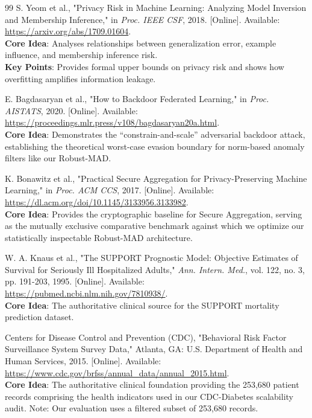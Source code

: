 \documentclass[10pt, a4paper, twocolumn]{article}
\begin{document}
\begin{thebibliography}{99}
 S. Yeom et al., "Privacy Risk in Machine Learning: Analyzing Model Inversion and Membership Inference," in \textit{Proc. IEEE CSF}, 2018. [Online]. Available: \url{https://arxiv.org/abs/1709.01604}. \\
\textbf{Core Idea}: Analyses relationships between generalization error, example influence, and membership inference risk. \\
\textbf{Key Points}: Provides formal upper bounds on privacy risk and shows how overfitting amplifies information leakage.

 E. Bagdasaryan et al., "How to Backdoor Federated Learning," in \textit{Proc. AISTATS}, 2020. [Online]. Available: \url{https://proceedings.mlr.press/v108/bagdasaryan20a.html}. \\
\textbf{Core Idea}: Demonstrates the ``constrain-and-scale'' adversarial backdoor attack, establishing the theoretical worst-case evasion boundary for norm-based anomaly filters like our Robust-MAD.

 K. Bonawitz et al., "Practical Secure Aggregation for Privacy-Preserving Machine Learning," in \textit{Proc. ACM CCS}, 2017. [Online]. Available: \url{https://dl.acm.org/doi/10.1145/3133956.3133982}. \\
\textbf{Core Idea}: Provides the cryptographic baseline for Secure Aggregation, serving as the mutually exclusive comparative benchmark against which we optimize our statistically inspectable Robust-MAD architecture.

 W. A. Knaus et al., "The SUPPORT Prognostic Model: Objective Estimates of Survival for Seriously Ill Hospitalized Adults," \textit{Ann. Intern. Med.}, vol. 122, no. 3, pp. 191-203, 1995. [Online]. Available: \url{https://pubmed.ncbi.nlm.nih.gov/7810938/}. \\
\textbf{Core Idea}: The authoritative clinical source for the SUPPORT mortality prediction dataset.

 Centers for Disease Control and Prevention (CDC), "Behavioral Risk Factor Surveillance System Survey Data," Atlanta, GA: U.S. Department of Health and Human Services, 2015. [Online]. Available: \url{https://www.cdc.gov/brfss/annual_data/annual_2015.html}. \\
\textbf{Core Idea}: The authoritative clinical foundation providing the 253,680 patient records comprising the health indicators used in our CDC-Diabetes scalability audit. Note: Our evaluation uses a filtered subset of 253,680 records.


\end{thebibliography}
\end{document}
